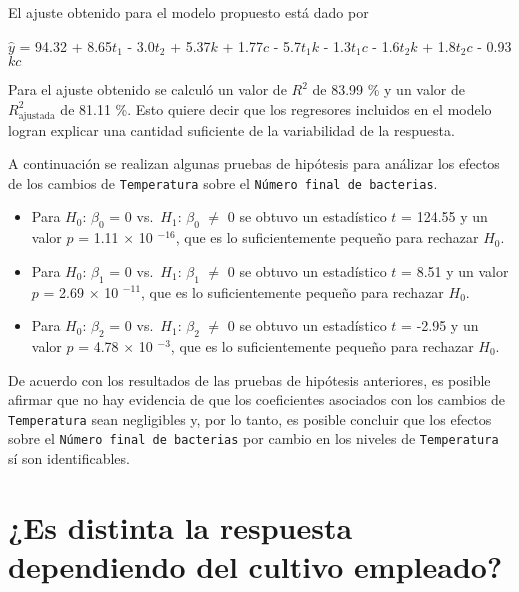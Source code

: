 \documentclass[10pt, spanish]{article}
\providecommand{\tightlist}{%
      \setlength{\itemsep}{0pt}\setlength{\parskip}{0pt}}
\begin{document}
    El ajuste obtenido para el modelo propuesto está dado por

    
    \(\hat{y}\) = 94.32 + 8.65\({t}_1\) - 3.0\({t}_2\) + 5.37\({k}\) +
1.77\({c}\) - 5.7\({t}_1{k}\) - 1.3\({t}_1{c}\) - 1.6\({t}_2{k}\) +
1.8\({t}_2{c}\) - 0.93\({k}{c}\)

    
    Para el ajuste obtenido se calculó un valor de \(R^2\) de 83.99 \% y un
valor de \(R^2_{\text{ajustada}}\) de 81.11 \%. Esto quiere decir que
los regresores incluidos en el modelo logran explicar una cantidad
suficiente de la variabilidad de la respuesta.

    
    A continuación se realizan algunas pruebas de hipótesis para análizar
los efectos de los cambios de \texttt{Temperatura} sobre el
\texttt{Número\ final\ de\ bacterias}.

    \begin{itemize}
\tightlist
\item
  Para \(H_0\): \(\beta_0\) = 0 vs.~\(H_1\): \(\beta_0\) \(\neq\) 0 se
  obtuvo un estadístico \(t\) = 124.55 y un valor \(p\) = 1.11
  \(\times\) 10 \(^{-16}\), que es lo suficientemente pequeño para
  rechazar \(H_0\).
\end{itemize}

    
    \begin{itemize}
\tightlist
\item
  Para \(H_0\): \(\beta_1\) = 0 vs.~\(H_1\): \(\beta_1\) \(\neq\) 0 se
  obtuvo un estadístico \(t\) = 8.51 y un valor \(p\) = 2.69 \(\times\)
  10 \(^{-11}\), que es lo suficientemente pequeño para rechazar
  \(H_0\).
\end{itemize}

    
    \begin{itemize}
\tightlist
\item
  Para \(H_0\): \(\beta_2\) = 0 vs.~\(H_1\): \(\beta_2\) \(\neq\) 0 se
  obtuvo un estadístico \(t\) = -2.95 y un valor \(p\) = 4.78 \(\times\)
  10 \(^{-3}\), que es lo suficientemente pequeño para rechazar \(H_0\).
\end{itemize}

    
    De acuerdo con los resultados de las pruebas de hipótesis anteriores, es
posible afirmar que no hay evidencia de que los coeficientes asociados
con los cambios de \texttt{Temperatura} sean negligibles y, por lo
tanto, es posible concluir que los efectos sobre el
\texttt{Número\ final\ de\ bacterias} por cambio en los niveles de
\texttt{Temperatura} sí son identificables.

    \hypertarget{es-distinta-la-respuesta-dependiendo-del-cultivo-empleado}{%
\section{¿Es distinta la respuesta dependiendo del cultivo
empleado?}\label{es-distinta-la-respuesta-dependiendo-del-cultivo-empleado}}
\end{document}
